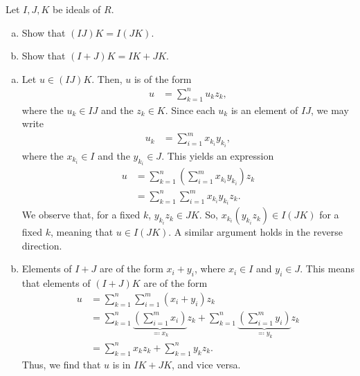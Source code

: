 \documentclass[10pt]{mypackage}
\begin{document}
\RaggedRight
\begin{problem}[Problem 1]
  Let $I,J,K$ be ideals of $R$.
  \begin{enumerate}[(a)]
    \item Show that $\left( IJ \right)K = I\left( JK \right)$.
    \item Show that $\left( I + J \right)K = IK + JK$.
  \end{enumerate}
\end{problem}
\begin{solution}\hfill
  \begin{enumerate}[(a)]
    \item Let $u\in \left( IJ \right)K$. Then, $u$ is of the form
      \begin{align*}
        u &= \sum_{k=1}^{n}u_kz_k,
      \end{align*}
      where the $u_k\in IJ$ and the $z_k\in K$. Since each $u_k$ is an element of $IJ$, we may write
      \begin{align*}
        u_k &= \sum_{i=1}^{m}x_{k_i}y_{k_i},
      \end{align*}
      where the $x_{k_i}\in I$ and the $y_{k_i}\in J$. This yields an expression
      \begin{align*}
        u &= \sum_{k=1}^{n}\left( \sum_{i=1}^{m} x_{k_i}y_{k_i} \right)z_k\\
          &= \sum_{k=1}^{n}\sum_{i=1}^{m}x_{k_i}y_{k_i}z_k.
      \end{align*}
      We observe that, for a fixed $k$, $y_{k_i}z_k\in JK$. So, $x_{k_i}\left( y_{k_i}z_k \right)\in I\left( JK \right)$ for a fixed $k$, meaning that $u\in I\left( JK \right)$. A similar argument holds in the reverse direction.
    \item Elements of $ I + J $ are of the form $x_i + y_i$, where $x_i\in I$ and $y_i\in J$. This means that elements of $ \left( I + J \right)K $ are of the form
      \begin{align*}
        u &= \sum_{k=1}^{n} \sum_{i=1}^{m} \left( x_i + y_i \right)z_k\\
          &= \sum_{k=1}^{n} \underbrace{\left( \sum_{i=1}^{m} x_i \right)}_{\eqcolon x_k}z_k + \sum_{k=1}^{n}\underbrace{\left( \sum_{i=1}^{m} y_i \right)}_{\eqcolon y_k}z_k\\
          &= \sum_{k=1}^{n} x_kz_k + \sum_{k=1}^{n} y_kz_k.
      \end{align*}
      Thus, we find that $u$ is in $IK + JK$, and vice versa.
  \end{enumerate}
\end{solution}
\end{document}
